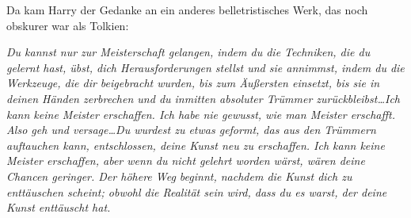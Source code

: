 Da kam Harry der Gedanke an ein anderes belletristisches Werk, das noch obskurer war als Tolkien:

\emph{Du kannst nur zur Meisterschaft gelangen, indem du die Techniken, die du gelernt hast, übst, dich Herausforderungen stellst und sie annimmst, indem du die Werkzeuge, die dir beigebracht wurden, bis zum Äußersten einsetzt, bis sie in deinen Händen zerbrechen und du inmitten absoluter Trümmer zurückbleibst…Ich kann keine Meister erschaffen. Ich habe nie gewusst, wie man Meister erschafft. Also geh und versage…Du wurdest zu etwas geformt, das aus den Trümmern auftauchen kann, entschlossen, deine Kunst neu zu erschaffen. Ich kann keine Meister erschaffen, aber wenn du nicht gelehrt worden wärst, wären deine Chancen geringer. Der höhere Weg beginnt, nachdem die Kunst dich zu enttäuschen scheint; obwohl die Realität sein wird, dass du es warst, der deine Kunst enttäuscht hat.}

